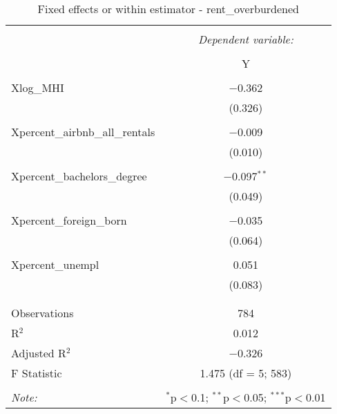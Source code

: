 \documentclass{article}
\begin{document}
\begin{table}[!htbp] \centering 
  \caption{Fixed effects or within estimator - rent\_overburdened} 
  \label{} 
  \begin{tabular}{@{\extracolsep{5pt}}lc} 
    \\[-1.8ex]\hline 
    \hline \\[-1.8ex] 
    & \multicolumn{1}{c}{\textit{Dependent variable:}} \\ 
    \cline{2-2} 
    \\[-1.8ex] & Y \\ 
    \hline \\[-1.8ex] 
    Xlog\_MHI & $-$0.362 \\ 
    & (0.326) \\ 
    & \\ 
    Xpercent\_airbnb\_all\_rentals & $-$0.009 \\ 
    & (0.010) \\ 
    & \\ 
    Xpercent\_bachelors\_degree & $-$0.097$^{**}$ \\ 
    & (0.049) \\ 
    & \\ 
    Xpercent\_foreign\_born & $-$0.035 \\ 
    & (0.064) \\ 
    & \\ 
    Xpercent\_unempl & 0.051 \\ 
    & (0.083) \\ 
    & \\ 
    \hline \\[-1.8ex] 
    Observations & 784 \\ 
    R$^{2}$ & 0.012 \\ 
    Adjusted R$^{2}$ & $-$0.326 \\ 
    F Statistic & 1.475 (df = 5; 583) \\ 
    \hline 
    \hline \\[-1.8ex] 
    \textit{Note:}  & \multicolumn{1}{r}{$^{*}$p$<$0.1; $^{**}$p$<$0.05; $^{***}$p$<$0.01} \\ 
  \end{tabular} 
\end{table} 
\end{document}

